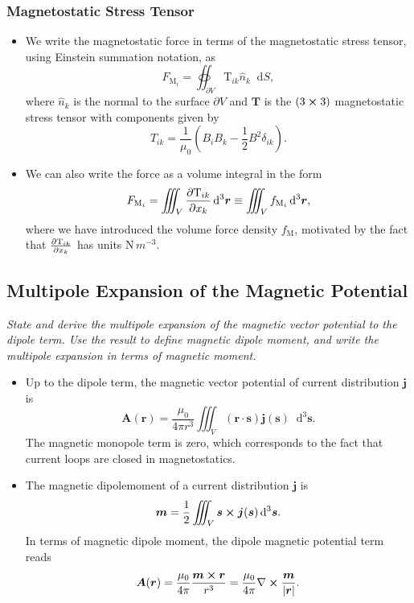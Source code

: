 \documentclass[11pt, a4paper]{article}
\newcommand{\diff}{\mathop{}\!\mathrm{d}} %
\newcommand{\dr}{\diff^{3} \r}  %
\renewcommand{\vec}[1]{\bm{#1}} %
\newcommand{\mat}[1]{\mathbf{#1}} %
\renewcommand{\r}{\vec{r}}
\newcommand{\A}{\vec{A}} %
\newcommand{\TT}{\mathrm{T}}  %
\newcommand{\mm}{\mu_{0}}  %
\newcommand{\m}{\vec{m}}  %
\renewcommand{\j}{\vec{j}}  %
\newcommand{\s}{\vec{s}}  %
\newcommand{\ds}{\diff^{3} \s}  %
\renewcommand{\curl}{\nabla \cross}
\begin{document}
\subsubsection{Magnetostatic Stress Tensor}
\begin{itemize}
	\item We write the magnetostatic force in terms of the magnetostatic stress tensor, using Einstein summation notation, as
	\begin{equation*}
		F_{\text{M}_{i}} = \oiint_{\partial V} \TT_{ik} \hat{n}_{k}\diff S,
	\end{equation*}
	where $ \hat{n}_{k} $ is the normal to the surface $ \partial V $ and $ \mat{T} $ is the $ (3 \cross 3) $ magnetostatic stress tensor with components given by
	\begin{equation*}
		T_{ik} = \frac{1}{\mm}\left(B_{i}B_{k} - \frac{1}{2}B^{2}\delta_{ik}\right).
	\end{equation*}
	
	\item We can also write the force as a volume integral in the form
	\begin{equation*}
		F_{\text{M}_{i}} = \iiint_{V}\pdv{\TT_{ik}}{x_{k}}\dr \equiv \iiint_{V}f_{\text{M}_{i}} \dr,
	\end{equation*} 
	where we have introduced the volume force density $ f_{\text{M}} $, motivated by the fact that $ \pdv{\TT_{ik}}{x_{k}} $ has units $ \si{\newton \, m^{-3}} $.
	
\end{itemize}
    

\subsection{Multipole Expansion of the Magnetic Potential}
\textit{State and derive the multipole expansion of the magnetic vector potential to the dipole term. Use the result to define magnetic dipole moment, and write the multipole expansion in terms of magnetic moment.}

\begin{itemize}
    \item Up to the dipole term, the magnetic vector potential of current distribution $ \j $ is
    \begin{equation*}
        \A(\r) = \frac{\mm}{4 \pi r^{3}} \iiint_{V} (\r \cdot \s)\j(\s)\ds.
    \end{equation*}
    The magnetic monopole term is zero, which corresponds to the fact that current loops are closed in magnetostatics.

    \item The magnetic dipolemoment of a current distribution $ \j $ is
    \begin{equation*}
        \m = \frac{1}{2}\iiint_{V} \s \cross \j(\s) \ds.
    \end{equation*}
    In terms of magnetic dipole moment, the dipole magnetic potential term reads
    \begin{equation*}
        \A(\r) = \frac{\mm}{4 \pi} \frac{\m \cross \r}{r^{3}} = \frac{\mm}{4\pi} \curl \frac{\m}{\abs{\r}}.
    \end{equation*}
    
\end{itemize}
\end{document}
